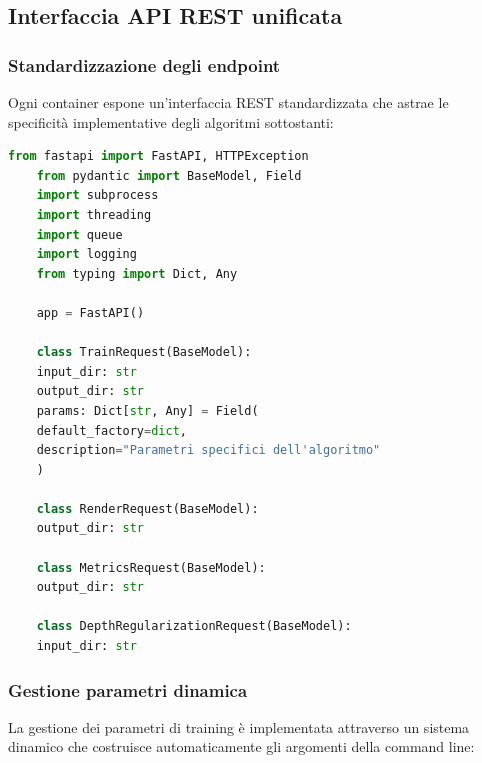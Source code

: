 \subsection{Interfaccia API REST unificata}

\subsubsection{Standardizzazione degli endpoint}

Ogni container espone un'interfaccia REST standardizzata che astrae le specificità implementative degli algoritmi sottostanti:

\begin{lstlisting}[language=python, caption=Definizione modelli dati per API REST]
	from fastapi import FastAPI, HTTPException
	from pydantic import BaseModel, Field
	import subprocess
	import threading
	import queue
	import logging
	from typing import Dict, Any
	
	app = FastAPI()
	
	class TrainRequest(BaseModel):
	input_dir: str  
	output_dir: str
	params: Dict[str, Any] = Field(
	default_factory=dict, 
	description="Parametri specifici dell'algoritmo"
	)
	
	class RenderRequest(BaseModel):
	output_dir: str  
	
	class MetricsRequest(BaseModel):
	output_dir: str
	
	class DepthRegularizationRequest(BaseModel):
	input_dir: str
\end{lstlisting}

\subsubsection{Gestione parametri dinamica}

La gestione dei parametri di training è implementata attraverso un sistema dinamico che costruisce automaticamente gli argomenti della command line:

